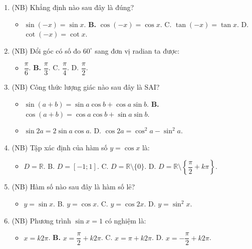 \documentclass[12pt, a4paper]{article}
\begin{document}
\begin{enumerate}[leftmargin=0.6cm]
    \item (NB) Khẳng định nào sau đây là đúng?
    \begin{itemize}[leftmargin=0.6cm]
        \item[A.] $\sin(-x) = \sin x$. \quad \textbf{B.} $\cos(-x) = \cos x$. \quad C. $\tan(-x) = \tan x$. \quad D. $\cot(-x) = \cot x$.
    \end{itemize}

    \item (NB) Đổi góc có số đo $60^\circ$ sang đơn vị radian ta được:
    \begin{itemize}[leftmargin=0.6cm]
        \item[A.] $\dfrac{\pi}{6}$. \quad \textbf{B.} $\dfrac{\pi}{3}$. \quad C. $\dfrac{\pi}{4}$. \quad D. $\dfrac{\pi}{2}$.
    \end{itemize}

    \item (NB) Công thức lượng giác nào sau đây là SAI?
    \begin{itemize}[leftmargin=0.6cm]
        \item[A.] $\sin(a + b) = \sin a \cos b + \cos a \sin b$. \quad \textbf{B.} $\cos(a + b) = \cos a \cos b + \sin a \sin b$.
        \item[C.] $\sin 2a = 2\sin a \cos a$. \quad D. $\cos 2a = \cos^2 a - \sin^2 a$.
    \end{itemize}

    \item (NB) Tập xác định của hàm số $y = \cos x$ là:
    \begin{itemize}[leftmargin=0.6cm]
        \item[\textbf{A.}] $D = \mathbb{R}$. \quad B. $D = [-1; 1]$. \quad C. $D = \mathbb{R} \setminus \{0\}$. \quad D. $D = \mathbb{R} \setminus \left\{\dfrac{\pi}{2} + k\pi\right\}$.
    \end{itemize}

    \item (NB) Hàm số nào sau đây là hàm số lẻ?
    \begin{itemize}[leftmargin=0.6cm]
        \item[\textbf{A.}] $y = \sin x$. \quad B. $y = \cos x$. \quad C. $y = \cos 2x$. \quad D. $y = \sin^2 x$.
    \end{itemize}

    \item (NB) Phương trình $\sin x = 1$ có nghiệm là:
    \begin{itemize}[leftmargin=0.6cm]
        \item[A.] $x = k2\pi$. \quad \textbf{B.} $x = \dfrac{\pi}{2} + k2\pi$. \quad C. $x = \pi + k2\pi$. \quad D. $x = -\dfrac{\pi}{2} + k2\pi$.
    \end{itemize}


\end{enumerate}
\end{document}
